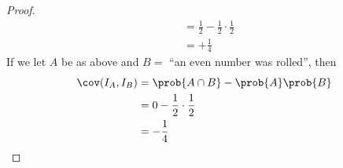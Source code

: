 \documentclass[%
  hwnumber=6,%
  studentnumber=20053722,%
  {name=Bryan Hoang}%
]{%
  mthe353answer%
}
\begin{document}
\begin{questions}
\begin{solution}
\begin{proof}
\begin{align*}
          &= \frac{1}{2} - \frac{1}{2} \cdot \frac{1}{2}\\
          &= +\frac{1}{4}
        \end{align*}
        If we let \(A\) be as above and \(B =\) ``an even number was rolled'', then
        \begin{align*}
          \cov(I_A,I_B) &= \prob{A \cap B} - \prob{A}\prob{B}\\
          &= 0 - \frac{1}{2} \cdot \frac{1}{2}\\
          &= -\frac{1}{4}
        \end{align*}
      \end{proof}
    \end{solution}
  \end{questions}
\end{document}
